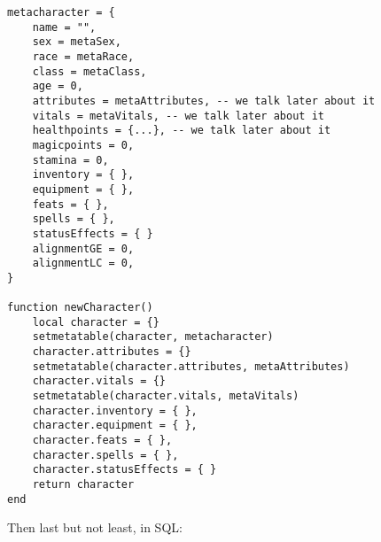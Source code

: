 \documentclass[openany,11pt,a4paper]{book}
\begin{document}
\begin{lstlisting}[style=LuaStyle]
metacharacter = {
	name = "",
	sex = metaSex,
	race = metaRace,
	class = metaClass,
	age = 0,
	attributes = metaAttributes, -- we talk later about it
	vitals = metaVitals, -- we talk later about it
	healthpoints = {...}, -- we talk later about it
	magicpoints = 0,
	stamina = 0,
	inventory = { },
	equipment = { },
	feats = { },
	spells = { },
	statusEffects = { }
	alignmentGE = 0,
	alignmentLC = 0,
}

function newCharacter()
	local character = {}
	setmetatable(character, metacharacter)
	character.attributes = {}
	setmetatable(character.attributes, metaAttributes)
	character.vitals = {}
	setmetatable(character.vitals, metaVitals)
	character.inventory = { },
	character.equipment = { },
	character.feats = { },
	character.spells = { },
	character.statusEffects = { }
	return character
end
\end{lstlisting}
Then last but not least, in SQL:
\end{document}
